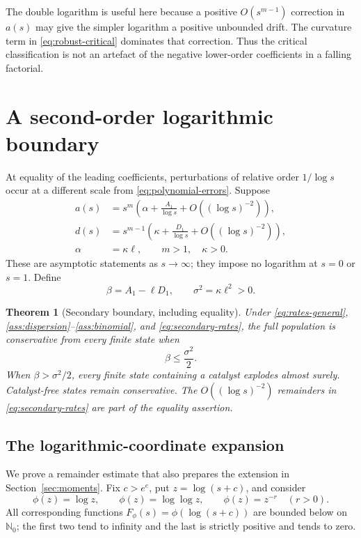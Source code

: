 \documentclass[11pt,a4paper]{article}
\newtheorem{theorem}{Theorem}
\theoremstyle{remark}\newtheorem{remark}[theorem]{Remark}
\newcommand{\Nzero}{\mathbb N_0}
\begin{document}
The double logarithm is useful here because a positive $O(s^{m-1})$ correction in $a(s)$ may give the simpler logarithm a positive unbounded drift. The curvature term in \eqref{eq:robust-critical} dominates that correction. Thus the critical classification is not an artefact of the negative lower-order coefficients in a falling factorial.

\section{A second-order logarithmic boundary}\label{sec:secondary}

At equality of the leading coefficients, perturbations of relative order $1/\log s$ occur at a different scale from \eqref{eq:polynomial-errors}. Suppose
\begin{align}
a(s)&=s^m\left(\alpha+\frac{A_1}{\log s}
                       +O((\log s)^{-2})\right),\nonumber\\
d(s)&=s^{m-1}\left(\kappa+\frac{D_1}{\log s}
                       +O((\log s)^{-2})\right),\label{eq:secondary-rates}\\
\alpha&=\kappa\ell,\qquad m>1,\quad\kappa>0.\nonumber
\end{align}
These are asymptotic statements as $s\to\infty$; they impose no logarithm at $s=0$ or $s=1$. Define
\begin{equation}\label{eq:secondary-coefficients}
\beta=A_1-\ell D_1,\qquad \sigma^2=\kappa\ell^2>0.
\end{equation}

\begin{theorem}[Secondary boundary, including equality]\label{thm:secondary}
Under \eqref{eq:rates-general}, \ref{ass:dispersion}--\ref{ass:binomial}, and \eqref{eq:secondary-rates}, the full population is conservative from every finite state when
\[
\beta\le\frac{\sigma^2}{2}.
\]
When $\beta>\sigma^2/2$, every finite state containing a catalyst explodes almost surely. Catalyst-free states remain conservative. The $O((\log s)^{-2})$ remainders in \eqref{eq:secondary-rates} are part of the equality assertion.
\end{theorem}

\subsection{The logarithmic-coordinate expansion}

We prove a remainder estimate that also prepares the extension in Section~\ref{sec:moments}. Fix $c>e^e$, put $z=\log(s+c)$, and consider
\begin{equation}\label{eq:phi-functions}
\phi(z)=\log z,\qquad \phi(z)=\log\log z,\qquad
\phi(z)=z^{-r}\quad(r>0).
\end{equation}
All corresponding functions $F_\phi(s)=\phi(\log(s+c))$ are bounded below on $\Nzero$; the first two tend to infinity and the last is strictly positive and tends to zero.
\end{document}
